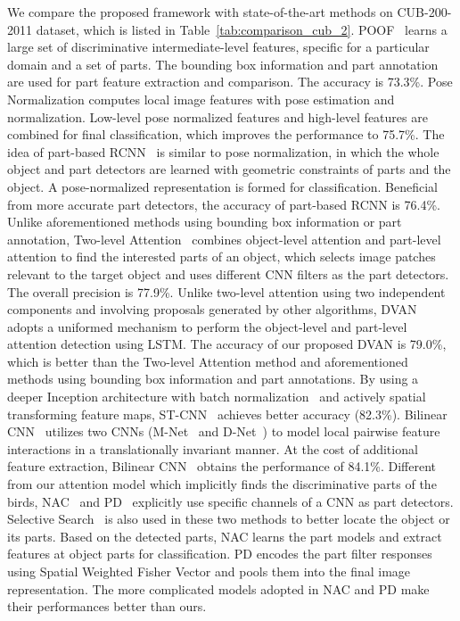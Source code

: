 \documentclass[journal]{IEEEtran}
\begin{document}
We compare the proposed framework with state-of-the-art methods on CUB-200-2011 dataset, which is listed in Table~\ref{tab:comparison_cub_2}. POOF~\cite{poof} learns a large set of discriminative intermediate-level features, specific for a particular domain and a set of parts. The bounding box information and part annotation are used for part feature extraction and comparison. The accuracy is 73.3\%. Pose Normalization \cite{pose_normalized} computes local image features with pose estimation and normalization. Low-level pose normalized features and high-level features are combined for final classification, which improves the performance to 75.7\%. The idea of part-based RCNN~\cite{part-based-rcnn} is similar to pose normalization, in which the whole object and part detectors are learned with geometric constraints of parts and the object. A pose-normalized representation is formed for classification. Beneficial from more accurate part detectors, the accuracy of part-based RCNN is 76.4\%. Unlike aforementioned methods using bounding box information or part annotation, Two-level Attention~\cite{two_level_attention} combines object-level attention and part-level attention to find the interested parts of an object, which selects image patches relevant to the target object and uses different CNN filters as the part detectors. The overall precision is 77.9\%. Unlike two-level attention using two independent components and involving proposals generated by other algorithms, DVAN adopts a uniformed mechanism to perform the object-level and part-level attention detection using LSTM. The accuracy of our proposed DVAN is 79.0\%, which is better than the Two-level Attention method and aforementioned methods using bounding box information and part annotations.
By using a deeper Inception architecture with batch normalization~\cite{bn} and actively spatial transforming feature maps, ST-CNN~\cite{Jaderberg:2015vo} achieves better accuracy (82.3\%). Bilinear CNN~\cite{bilinear} utilizes two CNNs (M-Net~\cite{Chatfield14} and D-Net~\cite{Simonyan:2014ws}) to model local pairwise feature interactions in a translationally invariant manner. At the cost of additional feature extraction, Bilinear CNN~\cite{bilinear} obtains the performance of 84.1\%.
Different from our attention model which implicitly finds the discriminative parts of the birds, NAC~\cite{nac} and PD~\cite{Zhang_2016_CVPR} explicitly use specific channels of a CNN as part detectors. Selective Search~\cite{selective} is also used in these two methods to better locate the object or its parts. Based on the detected parts, NAC learns the part models and extract features at object parts for classification. PD encodes the part filter responses using Spatial Weighted Fisher Vector and pools them into the final image representation. The more complicated models adopted in NAC and PD make their performances better than ours.
\end{document}
